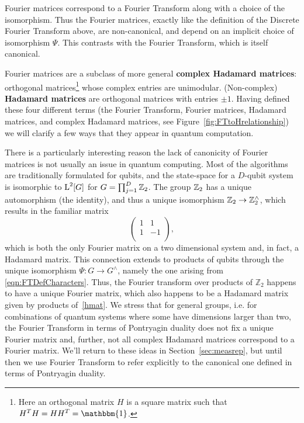 Fourier matrices correspond to a Fourier Transform along with a choice of the isomorphism. Thus the Fourier matrices, exactly like the definition of the Discrete Fourier Transform above, are non-canonical, and depend on an implicit choice of isomorphism $\Psi$. This contrasts with the Fourier Transform, which is itself canonical.

Fourier matrices are a subclass of more general \textbf{complex Hadamard matrices}: orthogonal matrices\footnote{Here an orthogonal matrix $H$ is a square matrix such that $H^TH=HH^T=\mathbbm{1}$.} whose complex entries are unimodular. (Non-complex) \textbf{Hadamard matrices} are orthogonal matrices with entries $\pm1$. Having defined these four different terms (the Fourier Transform, Fourier matrices, Hadamard matrices, and complex Hadamard matrices, see Figure~\ref{fig:FTtoHrelationship}) we will clarify a few ways that they appear in quantum computation.

There is a particularly interesting reason the lack of canonicity of Fourier matrices is not usually an issue in quantum computing. Most of the algorithms are traditionally formulated for qubits, and the state-space for a $D$-qubit system is isomorphic to $\operatorname{L}^2[G]$ for $G = \prod_{j=1}^D \mathbb{Z}_{2}$. The group $\mathbb{Z}_{2}$ has a unique automorphism (the identity), and thus a unique isomorphism $\mathbb{Z}_{2} \rightarrow \mathbb{Z}_{2}^\wedge$, which results in the familiar matrix
\begin{equation}
\label{hmat}
\begin{pmatrix}1 & 1 \\
1 & -1 \\
\end{pmatrix},
\end{equation}
which is both the only Fourier matrix on a two dimensional system and, in fact, a Hadamard matrix. This connection extends to products of qubits through the unique isomorphism $\Psi : G \rightarrow G^\wedge$, namely the one arising from \eqref{eqn:FTDefCharacters}. Thus, the Fourier transform over products of $\mathbb{Z}_2$ happens to have a unique Fourier matrix, which also happens to be a Hadamard matrix given by products of~\eqref{hmat}.  We stress that for general groups, i.e. for combinations of quantum systems where some have dimensions larger than two, the Fourier Transform in terms of Pontryagin duality does not fix a unique Fourier matrix and, further, not all complex Hadamard matrices correspond to a Fourier matrix. We'll return to these ideas in Section~\ref{sec:measrep}, but until then we use Fourier Transform to refer explicitly to the canonical one defined in terms of Pontryagin duality.

